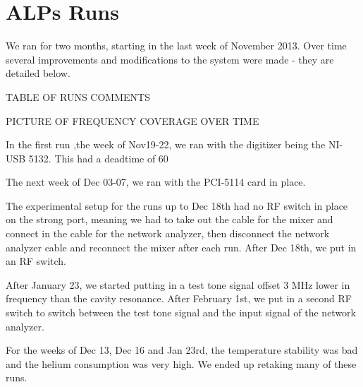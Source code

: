 \documentclass[11pt]{article}
\begin{document}
\section{ALPs Runs}

We ran for two months, starting in the last week of November 2013. Over time several improvements and modifications to the system were made - they are detailed below.

TABLE OF RUNS COMMENTS

PICTURE OF FREQUENCY COVERAGE OVER TIME

In the first run ,the week of Nov19-22, we ran with the digitizer being the NI-USB 5132. This had a deadtime of 60%

The next week of Dec 03-07, we ran with the PCI-5114 card in place. 

The experimental setup for the runs up to Dec 18th had no RF switch in place on the strong port, meaning we had to take out the cable for the mixer and connect in the cable for the network analyzer, then disconnect the network analyzer cable and reconnect the mixer after each run. After Dec 18th, we put in an RF switch.

After January 23, we started putting in a test tone signal offset 3 MHz lower in frequency than the cavity resonance. After February 1st, we put in a second RF switch to switch between the test tone signal and the input signal of the network analyzer. 

For the weeks of Dec 13, Dec 16 and Jan 23rd, the temperature stability was bad and the helium consumption was very high. We ended up retaking many of these runs.
\end{document}
